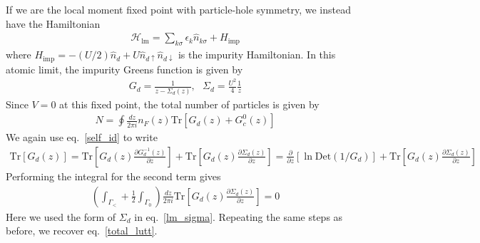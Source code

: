 If we are the local moment fixed point with particle-hole symmetry, we instead have the Hamiltonian
\begin{equation}\begin{aligned}
	\mathcal{H}_\text{lm} = \sum_{k\sigma}\epsilon_k \hat n_{k\sigma} + H_\text{imp}
\end{aligned}\end{equation}
where \(H_\text{imp} = -(U/2)\hat n_d + U\hat n_{d \uparrow} \hat n_{d \downarrow}\) is the impurity Hamiltonian. In this atomic limit, the impurity Greens function is given by~\cite{phillips2012advanced}
\begin{equation}\begin{aligned}
	\label{lm_sigma}
	G_d = \frac{1}{z - \Sigma_d(z)}, ~ ~ ~\Sigma_d = \frac{U^2}{4}\frac{1}{z}
\end{aligned}\end{equation}
Since \(V=0\) at this fixed point, the total number of particles is given by
\begin{equation}\begin{aligned}
	\label{total_num_lm}
	N = \oint \frac{dz}{2\pi i}n_F(z) \text{Tr}\left[G_{d}(z) + G_c^0(z)\right]
\end{aligned}\end{equation}
We again use eq.~\ref{self_id} to write
\begin{equation}\begin{aligned}
	\text{Tr}\left[G_{d}(z)\right] = \text{Tr}\left[ G_{d}(z)\frac{\partial{G_{d}^{-1}(z)}}{\partial{z}} \right] + \text{Tr}\left[ G_{d}(z)\frac{\partial{\Sigma_d(z)}}{\partial{z}} \right] = \frac{\partial{}}{\partial{z}}\left[\ln \text{Det}\left(1/G_{d}\right)\right] + \text{Tr}\left[ G_{d}(z)\frac{\partial{\Sigma_d(z)}}{\partial{z}} \right]
\end{aligned}\end{equation}
Performing the integral for the second term gives
\begin{equation}\begin{aligned}
	\left(\int_{\Gamma_<} + \frac{1}{2}\int_{\Gamma_0}\right)\frac{dz}{2\pi i}\text{Tr}\left[ G_{d}(z)\frac{\partial{\Sigma_d(z)}}{\partial{z}} \right] = 0
\end{aligned}\end{equation}
Here we used the form of \(\Sigma_d\) in eq.~\ref{lm_sigma}. Repeating the same steps as before, we recover eq.~\ref{total_lutt}.

